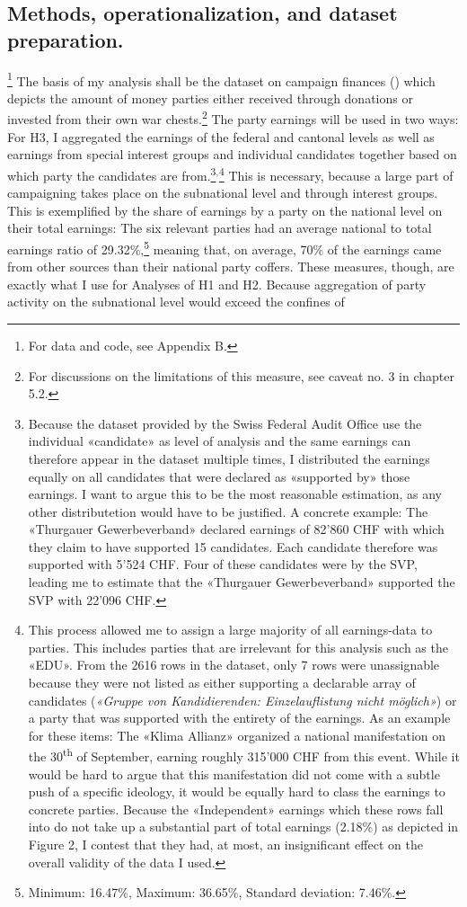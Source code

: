 \documentclass[11pt,a4paper]{article}
\begin{document}
\subsection{Methods, operationalization, and dataset preparation.}\footnote{ For data and code, see Appendix B.}
The basis of my analysis shall be the dataset on campaign finances (\cite{swiss_federal_audit_office_kampagnenfinanzierung_2023}) which depicts the amount of money parties either received through donations or invested from their own war chests.\footnote{For discussions on the limitations of this measure, see caveat no. 3 in chapter 5.2.} The party earnings will be used in two ways: For H3, I aggregated the earnings of the federal and cantonal levels as well as earnings from special interest groups and individual candidates together based on which party the candidates are from.\footnote{Because the dataset provided by the Swiss Federal Audit Office use the individual «candidate» as level of analysis and the same earnings can therefore appear in the dataset multiple times, I distributed the earnings equally on all candidates that were declared as «supported by» those earnings. I want to argue this to be the most reasonable estimation, as any other distributetion would have to be justified. A concrete example: The «Thurgauer Gewerbeverband» declared earnings of 82’860 CHF with which they claim to have supported 15 candidates. Each candidate therefore was supported with 5’524 CHF. Four of these candidates were by the SVP, leading me to estimate that the «Thurgauer Gewerbeverband» supported the SVP with 22’096 CHF.}$^{, }$\footnote{This process allowed me to assign a large majority of all earnings-data to parties. This includes parties that are irrelevant for this analysis such as the «EDU». From the 2616 rows in the dataset, only 7 rows were unassignable because they were not listed as either supporting a declarable array of candidates (\textit{«Gruppe von Kandidierenden: Einzelauflistung nicht möglich»}) or a party that was supported with the entirety of the earnings. As an example for these items: The «Klima Allianz» organized a national manifestation on the 30\textsuperscript{th} of September, earning roughly 315’000 CHF from this event. While it would be hard to argue that this manifestation did not come with a subtle push of a specific ideology, it would be equally hard to class the earnings to concrete parties. Because the «Independent» earnings which these rows fall into do not take up a substantial part of total earnings (2.18\%) as depicted in Figure 2, I contest that they had, at most, an insignificant effect on the overall validity of the data I used.} This is necessary, because a large part of campaigning takes place on the subnational level and through interest groups. This is exemplified by the share of earnings by a party on the national level on their total earnings: The six relevant parties had an average national to total earnings ratio of 29.32\%,\footnote{ Minimum: 16.47\%, Maximum: 36.65\%, Standard deviation: 7.46\%.} meaning that, on average, 70\% of the earnings came from other sources than their national party coffers. These measures, though, are exactly what I use for Analyses of H1 and H2. Because aggregation of party activity on the subnational level would exceed the confines of 
\end{document}
